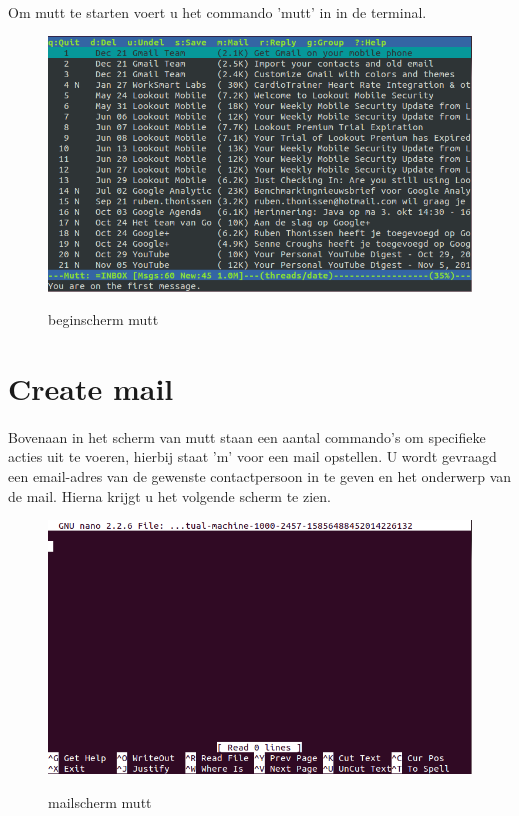 \documentclass[12pt,a4paper]{report}
\begin{document}
\begin{flushleft}
\paragraph*{}
Om mutt te starten voert u het commando 'mutt' in in de terminal.
\begin{figure}[H]
\includegraphics[scale=0.75]{images/mutt_01.png}
\label{mutt_01}
\centering 
\vspace{-10pt}
\caption{beginscherm mutt}
\end{figure} 
\pagebreak
\section{Create mail}
\paragraph*{}
Bovenaan in het scherm van mutt staan een aantal commando's om specifieke acties uit te voeren, hierbij staat 'm' voor een mail opstellen. U wordt gevraagd een email-adres van de gewenste contactpersoon in te geven en het onderwerp van de mail. Hierna krijgt u het volgende scherm te zien.
\begin{figure}[H]
\includegraphics[scale=0.75]{images/mutt_02.png}
\label{mutt_01}
\centering 
\vspace{-10pt}
\caption{mailscherm mutt}
\end{figure}

\end{flushleft}
\end{document}
